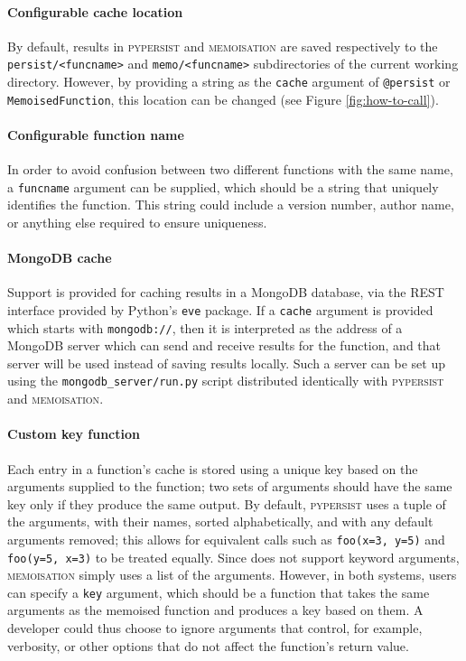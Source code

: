 \documentclass{deliverablereport}
\newcommand{\pypersist}{\textsc{pypersist}}
\newcommand{\Memoisation}{\textsc{memoisation}}
\begin{document}
\paragraph{Configurable cache location}
By default, results in \pypersist{} and \Memoisation{} are saved respectively to
the \texttt{persist/<funcname>} and \texttt{memo/<funcname>} subdirectories of
the current working directory.  However, by providing a string as the
\texttt{cache} argument of \texttt{@persist} or \texttt{MemoisedFunction}, this
location can be changed (see Figure \ref{fig:how-to-call}).

\paragraph{Configurable function name}
In order to avoid confusion between two different functions with the same name,
a \texttt{funcname} argument can be supplied, which should
be a string that uniquely identifies the function.  This string could include a
version number, author name, or anything else required to ensure uniqueness.

\paragraph{MongoDB cache}
Support is provided for caching results in a MongoDB database, via the REST
interface provided by Python's \texttt{eve} package.  If a \texttt{cache}
argument is provided which starts with \texttt{mongodb://}, then it is
interpreted as the address of a MongoDB server which can send and receive
results for the function, and that server will be used instead of saving results
locally.  Such a server can be set up using the \texttt{mongodb\_server/run.py}
script distributed identically with \pypersist{} and \Memoisation{}.

\paragraph{Custom key function}
Each entry in a function's cache is stored using a unique key based on the
arguments supplied to the function; two sets of arguments should have the same
key only if they produce the same output.  By default, \pypersist{} uses a tuple of the
arguments, with their names, sorted alphabetically, and with any default arguments removed;
this allows for equivalent calls such as \texttt{foo(x=3,
  y=5)} and \texttt{foo(y=5, x=3)} to be treated equally.
Since \GAP does not support keyword arguments,
\Memoisation{} simply uses a list of the arguments.  However, in both systems, users can
specify a \texttt{key} argument, which should be a function
that takes the same arguments as the memoised function and produces a key based on them.  A developer
could thus choose to ignore arguments that control, for example, verbosity, or
other options that do not affect the function's return value.
\end{document}

